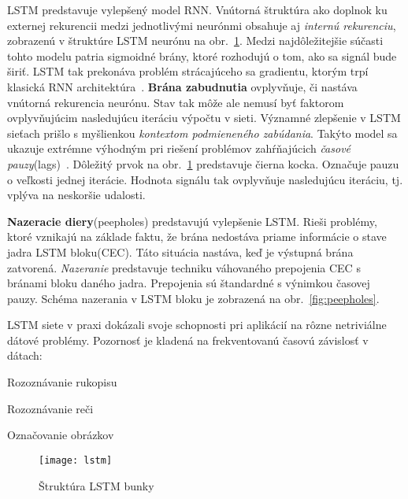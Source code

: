 LSTM predstavuje vylepšený model RNN. Vnútorná štruktúra ako doplnok ku externej rekurencii medzi jednotlivými neurónmi obsahuje aj \textit{internú rekurenciu}, zobrazenú v štruktúre LSTM neurónu na obr.~\ref{fig:lstm}. Medzi najdôležitejšie súčasti tohto modelu patria sigmoidné brány, ktoré rozhodujú o tom, ako sa signál bude širiť. LSTM tak prekonáva problém strácajúceho sa gradientu, ktorým trpí klasická RNN architektúra~\cite{hochreiter1997long}.
\newline
\textbf{Brána zabudnutia} ovplyvňuje, či nastáva vnútorná rekurencia neurónu. Stav tak môže ale nemusí byť faktorom ovplyvňujúcim nasledujúcu iteráciu výpočtu v sieti. Významné zlepšenie v LSTM sieťach prišlo s myšlienkou \textit{kontextom podmieneného zabúdania}. Takýto model sa ukazuje extrémne výhodným pri riešení problémov zahŕňajúcich \textit{časové pauzy}(lags)~\cite{gers2000learning}.
 Dôležitý prvok  na obr.~\ref{fig:lstm} predstavuje čierna kocka. Označuje pauzu o veľkosti jednej iterácie. Hodnota signálu tak ovplyvňuje nasledujúcu iteráciu, tj. vplýva na neskoršie udalosti.
\newline
\noindent


\textbf{Nazeracie diery}(peepholes) predstavujú vylepšenie LSTM. Rieši problémy, ktoré vznikajú na základe faktu, že brána nedostáva priame informácie o stave jadra LSTM bloku(CEC). Táto situácia nastáva, keď je výstupná brána zatvorená. \textit{Nazeranie} predstavuje techniku váhovaného prepojenia CEC s bránami bloku daného jadra. Prepojenia sú štandardné s výnimkou časovej pauzy. Schéma nazerania v LSTM bloku je zobrazená na obr.~\ref{fig:peepholes}.

LSTM siete v praxi dokázali svoje schopnosti pri aplikácií na rôzne netriviálne dátové problémy. Pozornosť je kladená na frekventovanú časovú závislosť v dátach:
\begin{my_itemize}
	\item{Rozoznávanie rukopisu} ~\cite{greff2015lstm}
	\item{Rozoznávanie reči} ~\cite{graves2013speech}
	\item{Označovanie obrázkov} ~\cite{kiros2014unifying}
\end{my_itemize}


\begin{figure}[H]
\begin{center}
\texttt{[image: lstm]}\end{center}
\caption[lstm]{Štruktúra LSTM bunky~\cite{gers2003learning}}\label{fig:lstm}
\end{figure}

